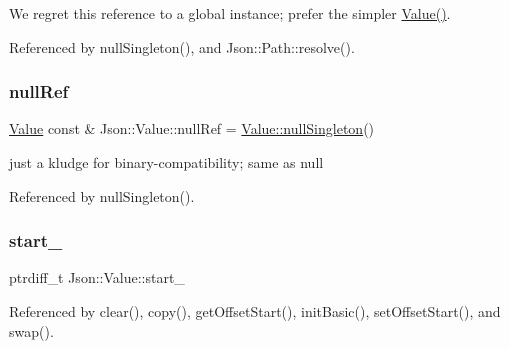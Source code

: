 We regret this reference to a global instance; prefer the simpler \hyperlink{classJson_1_1Value_ada6ba1369448fb0240bccc36efaa46f7_ada6ba1369448fb0240bccc36efaa46f7}{Value()}. 



Referenced by null\+Singleton(), and Json\+::\+Path\+::resolve().

\mbox{\label{classJson_1_1Value_aaee27e622f87266f861216d644603730_aaee27e622f87266f861216d644603730}} 
\subsubsection{\texorpdfstring{null\+Ref}{nullRef}}
{\footnotesize\ttfamily \hyperlink{classJson_1_1Value}{Value} const  \& Json\+::\+Value\+::null\+Ref = \hyperlink{classJson_1_1Value_af2f124567acc35d021a424e53ebdfcab_af2f124567acc35d021a424e53ebdfcab}{Value\+::null\+Singleton}()\hspace{0.3cm}{\ttfamily [static]}}



just a kludge for binary-\/compatibility; same as null 



Referenced by null\+Singleton().

\mbox{\label{classJson_1_1Value_a1c3aeb0fa8fefe93776cb347c76a25a8_a1c3aeb0fa8fefe93776cb347c76a25a8}} 
\subsubsection{\texorpdfstring{start\+\_\+}{start\_}}
{\footnotesize\ttfamily ptrdiff\+\_\+t Json\+::\+Value\+::start\+\_\+\hspace{0.3cm}{\ttfamily [private]}}



Referenced by clear(), copy(), get\+Offset\+Start(), init\+Basic(), set\+Offset\+Start(), and swap().

\mbox{\label{classJson_1_1Value_abd222c2536dc88bf330dedcd076d2356_abd222c2536dc88bf330dedcd076d2356}} 
